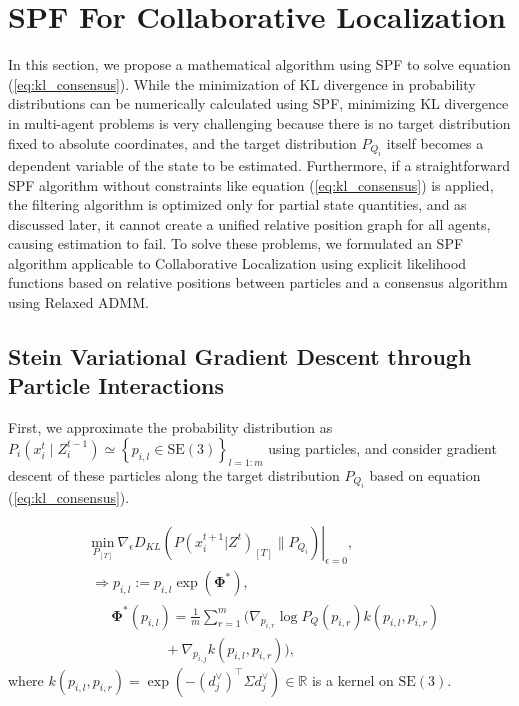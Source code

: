 \documentclass[a4paper,fleqn,10pt,twocolumn]{SICE_ISCS}
\begin{document}
\section{SPF For Collaborative Localization}

In this section, we propose a mathematical algorithm using SPF to solve equation (\ref{eq:kl_consensus}). While the minimization of KL divergence in probability distributions can be numerically calculated using SPF, minimizing KL divergence in multi-agent problems is very challenging because there is no target distribution fixed to absolute coordinates, and the target distribution $P_{Q_i}$ itself becomes a dependent variable of the state to be estimated. Furthermore, if a straightforward SPF algorithm without constraints like equation (\ref{eq:kl_consensus}) is applied, the filtering algorithm is optimized only for partial state quantities, and as discussed later, it cannot create a unified relative position graph for all agents, causing estimation to fail. To solve these problems, we formulated an SPF algorithm applicable to Collaborative Localization using explicit likelihood functions based on relative positions between particles and a consensus algorithm using Relaxed ADMM.

\subsection{Stein Variational Gradient Descent through Particle Interactions}

First, we approximate the probability distribution as $P_{i}\left( x_{i}^{t} \mid Z_{i}^{t-1}\right)\simeq \left\{ p_{i,l}\in \mathrm{SE(3)} \right\}_{l=1:m}$ using particles, and consider gradient descent of these particles along the target distribution $P_{Q_i}$ based on equation (\ref{eq:kl_consensus}).

\begin{equation}
\begin{aligned}\label{eq:svgd_min}
&\underset{P_{[T]}}{\text{min}} \: \nabla_\epsilon \left . D_{KL}(P(x_i^{t+1}|Z^{t})_{[T]} \| P_{Q_i})\right |_{\epsilon = 0},\\
&\Rightarrow p_{i,l}:= p_{i,l} \exp({\boldsymbol{\Phi}}^*),\\
&\quad \:\: {\boldsymbol{\Phi}}^*(p_{i,l}) = \frac{1}{m}\sum_{r=1}^m(\nabla_{p_{i,r}}\log P_Q(p_{i,r})k(p_{i,l},p_{i,r}) \\
&\qquad \qquad \quad \: + \nabla_{p_{i,j}}k(p_{i,l},p_{i,r})),
\end{aligned}
\end{equation}
where $k(p_{i,l},p_{i,r})=\exp \left(-(d_j^\vee)^{\top} \Sigma d_j^\vee \right)\in \mathbb{R}$ is a kernel on $\mathrm{SE(3)}$.
\end{document}
